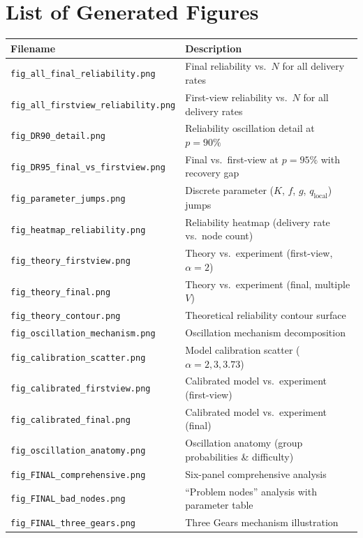 \documentclass[12pt,a4paper]{article}
\begin{document}
\section{List of Generated Figures}

\begin{table}[H]
\centering
\begin{tabular}{ll}
\toprule
\textbf{Filename} & \textbf{Description} \\
\midrule
\texttt{fig\_all\_final\_reliability.png} & Final reliability vs.\ $N$ for all delivery rates \\
\texttt{fig\_all\_firstview\_reliability.png} & First-view reliability vs.\ $N$ for all delivery rates \\
\texttt{fig\_DR90\_detail.png} & Reliability oscillation detail at $p = 90\%$ \\
\texttt{fig\_DR95\_final\_vs\_firstview.png} & Final vs.\ first-view at $p = 95\%$ with recovery gap \\
\texttt{fig\_parameter\_jumps.png} & Discrete parameter ($K$, $f$, $g$, $q_{\text{local}}$) jumps \\
\texttt{fig\_heatmap\_reliability.png} & Reliability heatmap (delivery rate vs.\ node count) \\
\texttt{fig\_theory\_firstview.png} & Theory vs.\ experiment (first-view, $\alpha = 2$) \\
\texttt{fig\_theory\_final.png} & Theory vs.\ experiment (final, multiple $V$) \\
\texttt{fig\_theory\_contour.png} & Theoretical reliability contour surface \\
\texttt{fig\_oscillation\_mechanism.png} & Oscillation mechanism decomposition \\
\texttt{fig\_calibration\_scatter.png} & Model calibration scatter ($\alpha = 2, 3, 3.73$) \\
\texttt{fig\_calibrated\_firstview.png} & Calibrated model vs.\ experiment (first-view) \\
\texttt{fig\_calibrated\_final.png} & Calibrated model vs.\ experiment (final) \\
\texttt{fig\_oscillation\_anatomy.png} & Oscillation anatomy (group probabilities \& difficulty) \\
\texttt{fig\_FINAL\_comprehensive.png} & Six-panel comprehensive analysis \\
\texttt{fig\_FINAL\_bad\_nodes.png} & ``Problem nodes'' analysis with parameter table \\
\texttt{fig\_FINAL\_three\_gears.png} & Three Gears mechanism illustration \\
\bottomrule
\end{tabular}
\end{table}
\end{document}
